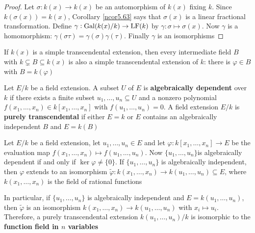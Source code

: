 \documentclass[11pt]{article}
\DeclareMathOperator{\Frac}{Frac}
\begin{document}
\begin{proof}
Let \(\sigma:k(x)\to k(x)\) be an automorphism of \(k(x)\) fixing \(k\). Since
\(k(\sigma(x))=k(x)\), Corollary \ref{ncor5.63} says that \(\sigma(x)\) is a linear
fractional transformation. Define \(\gamma:\operatorname{Gal}(k(x)/k)\to\operatorname{LF}(k)\) by 
\(\gamma:\sigma\mapsto\sigma(x)\). Now \(\gamma\) is a homomorphism:
\(\gamma(\sigma\tau)=\gamma(\sigma)\gamma(\tau)\). Finally \(\gamma\) is an isomorphisms
\end{proof}

\begin{theorem}
If \(k(x)\) is a simple transcendental extension, then every intermediate
field \(B\) with \(k\subsetneq B\subseteq k(x)\) is also a simple
transcendental extension of \(k\): there is \(\varphi\in B\) with \(B=k(\varphi)\)
\end{theorem}

\begin{definition}[]
Let \(E/k\) be a field extension. A subset \(U\) of \(E\) is 
\textbf{algebraically dependent} over \(k\) if there exists a finite subset 
\(u_1,\dots,u_n\subseteq U\) and a nonzero polynomial
\(f(x_1,\dots,x_n)\in k[x_1,\dots,x_n]\) with \(f(u_1,\dots,u_n)=0\). A field
extension \(E/k\) is \textbf{purely transcendental} if either \(E=k\) or \(E\) contains
an algebraically independent \(B\) and \(E=k(B)\)
\end{definition}

Let \(E/k\) be a field extension, let \(u_1,\dots,u_n\in E\) and let 
\(\varphi:k[x_1,\dots,x_n]\to E\) be the evaluation map
\(f(x_1,\dots,x_n)\mapsto f(u_1,\dots,u_n)\). Now
\(\{u_1,\dots,u_n\}\)is algebraically dependent if and only if \(\ker\varphi\neq\{0\}\).
If \(\{u_1,\dots,u_n\}\) is algebraically independent, then \(\varphi\) extends to an
isomorphism \(\widetilde{\varphi}:k(x_1,\dots,x_n)\to k(u_1,\dots,u_n)\subseteq
   E\), where 
\(k(x_1,\dots,x_n)\) is the field of rational functions
\begin{center}
\end{center}

In particular, if \(\{u_1,\dots,u_n\}\) is algebraically independent and
\(E=k(u_1,\dots,u_n)\), then \(\widetilde{\varphi}\) is an isomorphism 
\(k(x_1,\dots,x_n)\to k(u_1,\dots,u_n)\) with \(x_i\mapsto u_i\). Therefore,
a purely transcendental extension \(k(u_1,\dots,u_n)/k\) is isomorphic to the 
\textbf{function field in \(n\) variables}
\end{document}
